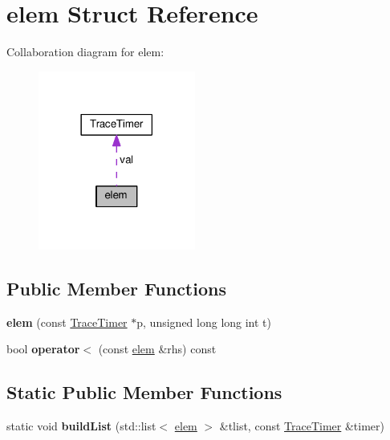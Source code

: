 \hypertarget{structelem}{}\section{elem Struct Reference}
\label{structelem}


Collaboration diagram for elem\+:
\nopagebreak
\begin{figure}[H]
\begin{center}
\leavevmode
\includegraphics[width=146pt]{structelem__coll__graph}
\end{center}
\end{figure}
\subsection*{Public Member Functions}
\begin{DoxyCompactItemize}
\item 
\hypertarget{structelem_a1b3c3f35e36509cd5c5d4b58d2cd2c4b}{}{\bfseries elem} (const \hyperlink{classTraceTimer}{Trace\+Timer} $\ast$p, unsigned long long int t)\label{structelem_a1b3c3f35e36509cd5c5d4b58d2cd2c4b}

\item 
\hypertarget{structelem_a63a278276a0c0ba917d363366dfd57b4}{}bool {\bfseries operator$<$} (const \hyperlink{structelem}{elem} \&rhs) const \label{structelem_a63a278276a0c0ba917d363366dfd57b4}

\end{DoxyCompactItemize}
\subsection*{Static Public Member Functions}
\begin{DoxyCompactItemize}
\item 
\hypertarget{structelem_a89030e25e760d130062432961126f9c9}{}static void {\bfseries build\+List} (std\+::list$<$ \hyperlink{structelem}{elem} $>$ \&tlist, const \hyperlink{classTraceTimer}{Trace\+Timer} \&timer)\label{structelem_a89030e25e760d130062432961126f9c9}

\end{DoxyCompactItemize}
